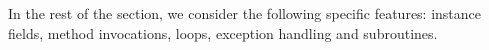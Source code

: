  In the rest of the section, we consider the following specific features: instance fields, method invocations, 
loops, exception handling and subroutines. 



